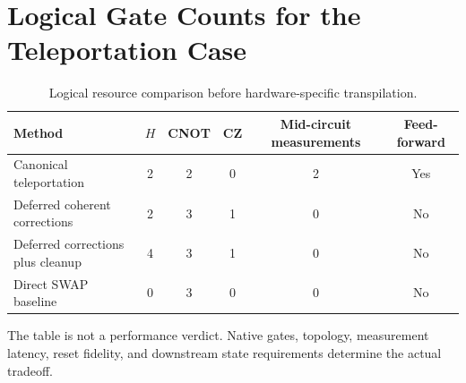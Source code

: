 \section{Logical Gate Counts for the Teleportation Case}
\label{app:gate-counts}

\begin{table}[ht]
\centering
\caption{Logical resource comparison before hardware-specific transpilation.}
\begin{tabular}{@{}lccccc@{}}
\toprule
Method & $H$ & CNOT & CZ & Mid-circuit measurements & Feed-forward\\
\midrule
Canonical teleportation & 2 & 2 & 0 & 2 & Yes\\
Deferred coherent corrections & 2 & 3 & 1 & 0 & No\\
Deferred corrections plus cleanup & 4 & 3 & 1 & 0 & No\\
Direct SWAP baseline & 0 & 3 & 0 & 0 & No\\
\bottomrule
\end{tabular}
\end{table}

The table is not a performance verdict. Native gates, topology, measurement
latency, reset fidelity, and downstream state requirements determine the actual
tradeoff.

